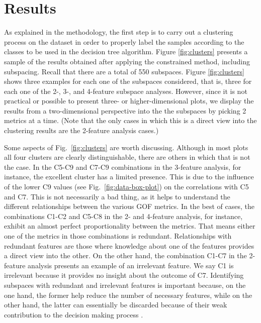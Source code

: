 
\section{Results}
\label{sec:results}

As explained in the methodology, the first step is to carry out a clustering process on the dataset in order to properly label the samples according to the classes to be used in the decision tree algorithm. Figure \ref{fig:clusters} presents a sample of the results obtained after applying the constrained \kmeans{} method, including subspacing. Recall that there are a total of 550 subspaces. Figure \ref{fig:clusters} shows three examples for each one of the subspaces considered, that is, three for each one of the 2-, 3-, and 4-feature subspace analyses. However, since it is not practical or possible to present three- or higher-dimensional plots, we display the results from a two-dimensional perspective into the the subspaces by picking 2 metrics at a time. (Note that the only cases in which this is a direct view into the clustering results are the 2-feature analysis cases.)

Some aspects of Fig.~\ref{fig:clusters} are worth discussing. Although in most plots all four clusters are clearly distinguishable, there are others in which that is not the case. In the C5-C9 and C7-C9 combinations in the 3-feature analysis, for instance, the excellent cluster has a limited presence. This is due to the influence of the lower C9 values (see Fig.~\ref{fig:data-box-plot}) on the correlations with C5 and C7. This is not necessarily a bad thing, as it helps to understand the different relationships between the various GOF metrics. In the best of cases, the combinations C1-C2 and C5-C8 in the 2- and 4-feature analysis, for instance, exhibit an almost perfect proportionality between the metrics. That means either one of the metrics in those combinations is redundant. Relationships with redundant features are those where knowledge about one of the features provides a direct view into the other. On the other hand, the combination C1-C7 in the 2-feature analysis presents an example of an irrelevant feature. We say C1 is irrelevant because it provides no insight about the outcome of C7. Identifying subspaces with redundant and irrelevant features is important because, on the one hand, the former help reduce the number of necessary features, while on the other hand, the latter can essentially be discarded because of their weak contribution to the decision making process \citep{Dy_2004_MLR}.

